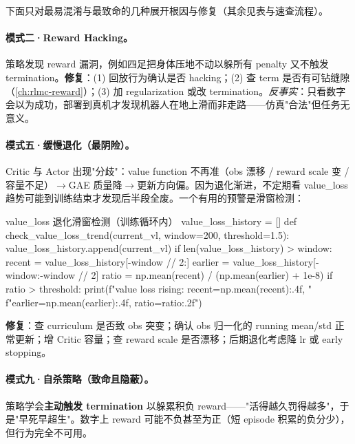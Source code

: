 下面只对最易混淆与最致命的几种展开根因与修复（其余见表与速查流程）。

\paragraph{模式二·Reward Hacking。}策略发现 reward 漏洞，例如四足把身体压地不动以躲所有 penalty 又不触发 termination。\textbf{修复}：(1) 回放行为确认是否 hacking；(2) 查 term 是否有可钻缝隙（\cref{ch:rlmc-reward}）；(3) 加 regularization 或改 termination。\emph{反事实}：只看数字会以为成功，部署到真机才发现机器人在地上滑而非走路——仿真"合法"但任务无意义。

\paragraph{模式五·缓慢退化（最阴险）。}Critic 与 Actor 出现"分歧"：value function 不再准（obs 漂移 / reward scale 变 / 容量不足）$\to$GAE 质量降$\to$更新方向偏。因为退化渐进，不定期看 value\_loss 趋势可能到训练结束才发现后半段全废。一个有用的预警是滑窗检测：

\begin{codebox}[Python]{value\_loss 退化滑窗检测（训练循环内）}
value_loss_history = []
def check_value_loss_trend(current_vl, window=200, threshold=1.5):
    value_loss_history.append(current_vl)
    if len(value_loss_history) > window:
        recent  = value_loss_history[-window // 2:]
        earlier = value_loss_history[-window:-window // 2]
        ratio = np.mean(recent) / (np.mean(earlier) + 1e-8)
        if ratio > threshold:
            print(f"value loss rising: recent={np.mean(recent):.4f}, "
                  f"earlier={np.mean(earlier):.4f}, ratio={ratio:.2f}")
\end{codebox}

\textbf{修复}：查 curriculum 是否致 obs 突变；确认 obs 归一化的 running mean/std 正常更新；增 Critic 容量；查 reward scale 是否漂移；后期退化考虑降 lr 或 early stopping。

\paragraph{模式九·自杀策略（致命且隐蔽）。}策略学会\textbf{主动触发 termination} 以躲累积负 reward——"活得越久罚得越多"，于是"早死早超生"。数字上 reward 可能不负甚至为正（短 episode 积累的负分少），但行为完全不可用。


